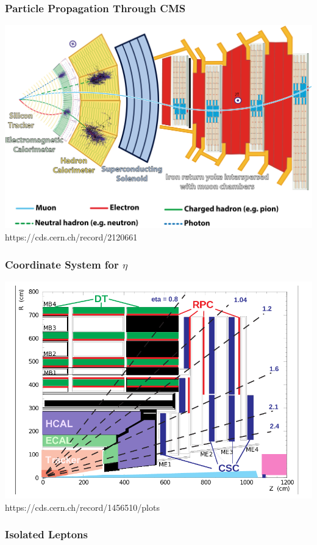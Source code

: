\documentclass{beamer}
\begin{document}
\begin{frame}
  \frametitle{Particle Propagation Through CMS}

  \centering
  \includegraphics[width=0.9\linewidth]{figures/CMSslice_whiteBackground.png}
  \tiny{https://cds.cern.ch/record/2120661}

\end{frame}

\begin{frame}
  \frametitle{Coordinate System for $\eta$}

  \centering
  \includegraphics[width=0.8\linewidth]{figures/pictures_MuonSys-mod3.png}
  \tiny{https://cds.cern.ch/record/1456510/plots}

\end{frame}

\begin{frame}
  \frametitle{Isolated Leptons}



\end{frame}
\end{document}
